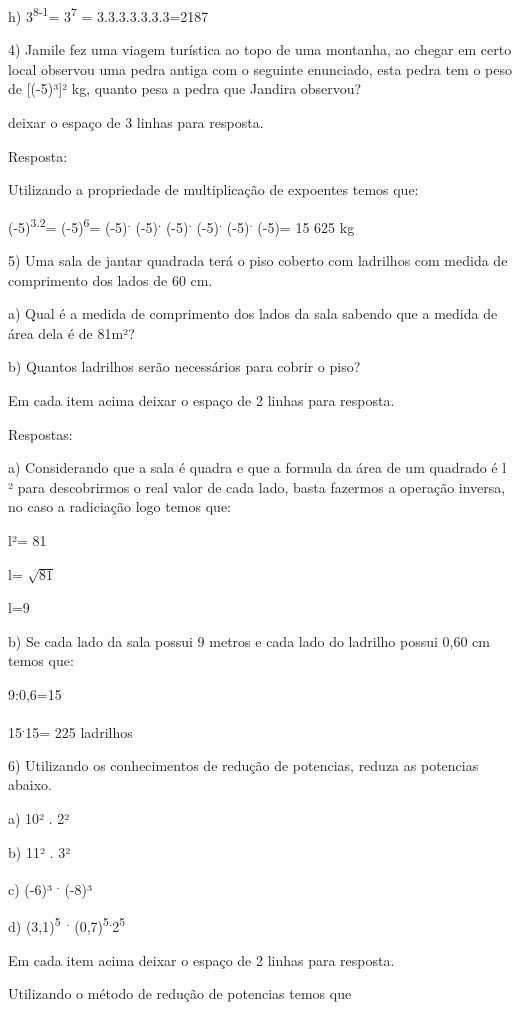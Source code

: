 {h) 3\textsuperscript{8-1}= 3\textsuperscript{7} = 3.3.3.3.3.3.3=2187

4) Jamile fez uma viagem turística ao topo de uma montanha, ao chegar em
certo local observou uma pedra antiga com o seguinte enunciado, esta
pedra tem o peso de {[}(-5)³{]}² kg, quanto pesa a pedra que Jandira
observou?

deixar o espaço de 3 linhas para resposta.

Resposta:

Utilizando a propriedade de multiplicação de expoentes temos que:

(-5)\textsuperscript{3.2}= (-5)\textsuperscript{6}=
(-5)\textsuperscript{.} (-5)\textsuperscript{.} (-5)\textsuperscript{.}
(-5)\textsuperscript{.} (-5)\textsuperscript{.} (-5)= 15 625 kg

5) Uma sala de jantar quadrada terá o piso coberto com ladrilhos com
medida de comprimento dos lados de 60 cm.

a) Qual é a medida de comprimento dos lados da sala sabendo que a medida
de área dela é de 81m²?

b) Quantos ladrilhos serão necessários para cobrir o piso?

Em cada item acima deixar o espaço de 2 linhas para resposta.

Respostas:

a) Considerando que a sala é quadra e que a formula da área de um
quadrado é l ² para descobrirmos o real valor de cada lado, basta
fazermos a operação inversa, no caso a radiciação logo temos que:

l²= 81

l= \(\sqrt{81}\)

l=9

b) Se cada lado da sala possui 9 metros e cada lado do ladrilho possui
0,60 cm temos que:

9:0,6=15

15\textsuperscript{.}15= 225 ladrilhos

6) Utilizando os conhecimentos de redução de potencias, reduza as
potencias abaixo.

a) 10² . 2²

b) 11² . 3²

c) (-6)³ \textsuperscript{.} (-8)³

d) (3,1)\textsuperscript{5~.}
(0,7)\textsuperscript{5.}2\textsuperscript{5}

Em cada item acima deixar o espaço de 2 linhas para resposta.

Utilizando o método de redução de potencias temos que

}
